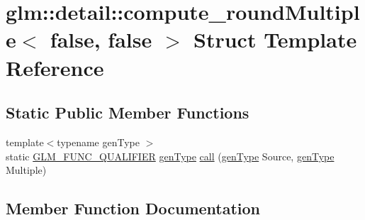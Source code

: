 \hypertarget{structglm_1_1detail_1_1compute__round_multiple_3_01false_00_01false_01_4}{}\section{glm\+:\+:detail\+:\+:compute\+\_\+round\+Multiple$<$ false, false $>$ Struct Template Reference}
\label{structglm_1_1detail_1_1compute__round_multiple_3_01false_00_01false_01_4}
\subsection*{Static Public Member Functions}
\begin{DoxyCompactItemize}
\item 
{\footnotesize template$<$typename gen\+Type $>$ }\\static \hyperlink{setup_8hpp_a33fdea6f91c5f834105f7415e2a64407}{G\+L\+M\+\_\+\+F\+U\+N\+C\+\_\+\+Q\+U\+A\+L\+I\+F\+I\+ER} \hyperlink{structglm_1_1detail_1_1gen_type}{gen\+Type} \hyperlink{structglm_1_1detail_1_1compute__round_multiple_3_01false_00_01false_01_4_a9242ffccd610779b8020ad382d47213a}{call} (\hyperlink{structglm_1_1detail_1_1gen_type}{gen\+Type} Source, \hyperlink{structglm_1_1detail_1_1gen_type}{gen\+Type} Multiple)
\end{DoxyCompactItemize}


\subsection{Member Function Documentation}
\mbox{\label{structglm_1_1detail_1_1compute__round_multiple_3_01false_00_01false_01_4_a9242ffccd610779b8020ad382d47213a}} 
